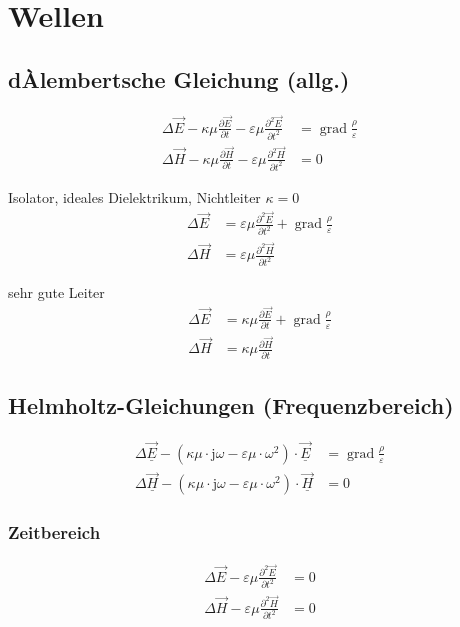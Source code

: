 \section{Wellen}
\subsection{dÀlembertsche Gleichung (allg.)}

\begin{align*}
    \Delta \vec{E}-\kappa \mu \frac{\partial \vec{E}}{\partial t}-\varepsilon \mu \frac{\partial^{2} \vec{E}}{\partial t^{2}} &= \operatorname{grad} \frac{\rho}{\varepsilon}\\
    \Delta \vec{H}-\kappa \mu \frac{\partial \vec{H}}{\partial t}-\varepsilon \mu \frac{\partial^{2} \vec{H}}{\partial t^{2}} &= 0
\end{align*}

Isolator, ideales Dielektrikum, Nichtleiter $\kappa = 0$
\begin{align*}
    \Delta \vec{E} &=\varepsilon \mu \frac{\partial^{2} \vec{E}}{\partial t^{2}}+\operatorname{grad} \frac{\rho}{\varepsilon} \\
    \Delta \vec{H} &=\varepsilon \mu \frac{\partial^{2} \vec{H}}{\partial t^{2}}
\end{align*}

sehr gute Leiter
\begin{align*}
    \Delta \vec{E} &=\kappa \mu \frac{\partial \vec{E}}{\partial t}+\operatorname{grad} \frac{\rho}{\varepsilon} \\
    \Delta \vec{H} &=\kappa \mu \frac{\partial \vec{H}}{\partial t}
\end{align*}

\subsection{Helmholtz-Gleichungen (Frequenzbereich)}
\begin{align*}
    \Delta \underline{\vec{E}}-\left(\kappa \mu \cdot \mathrm{j} \omega-\varepsilon \mu \cdot \omega^{2}\right) \cdot \underline{\vec{E}} &= \operatorname{grad} \frac{\rho}{\varepsilon} \\
    \Delta \underline{\vec{H}}-\left(\kappa \mu \cdot \mathrm{j} \omega-\varepsilon \mu \cdot \omega^{2}\right) \cdot \underline{\vec{H}} &= 0
\end{align*}

\subsubsection{Zeitbereich}
\begin{align*}
    \Delta \vec{E}-\varepsilon \mu \frac{\partial^{2} \vec{E}}{\partial t^{2}}&=0 \\
    \Delta \vec{H}-\varepsilon \mu \frac{\partial^{2} \vec{H}}{\partial t^{2}}&=0
\end{align*}

